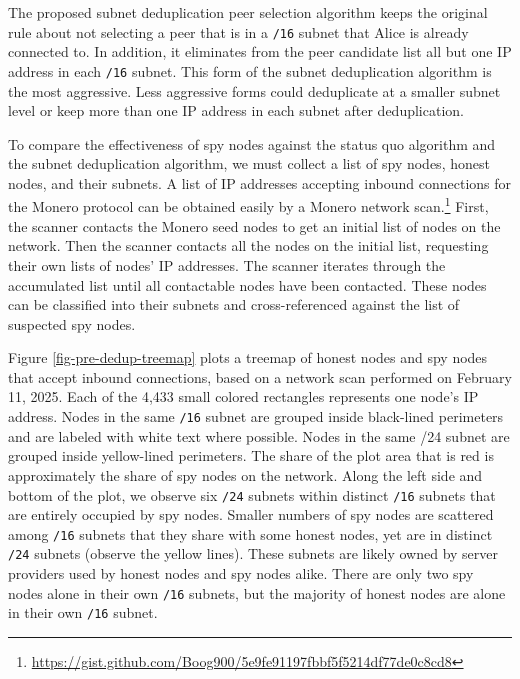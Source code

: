 \documentclass[usletter,11pt,english,openany]{article}
\begin{document}
The proposed subnet deduplication peer selection algorithm keeps the
original rule about not selecting a peer that is in a \texttt{/16}
subnet that Alice is already connected to. In addition, it eliminates
from the peer candidate list all but one IP address in each \texttt{/16}
subnet. This form of the subnet deduplication algorithm is the most
aggressive. Less aggressive forms could deduplicate at a smaller subnet
level or keep more than one IP address in each subnet after deduplication.

To compare the effectiveness of spy nodes against the status quo algorithm
and the subnet deduplication algorithm, we must collect a list of
spy nodes, honest nodes, and their subnets. A list of IP addresses
accepting inbound connections for the Monero protocol can be obtained
easily by a Monero network scan.\footnote{\href{https://gist.github.com/Boog900/5e9fe91197fbbf5f5214df77de0c8cd8}{https://gist.github.com/Boog900/5e9fe91197fbbf5f5214df77de0c8cd8}}
First, the scanner contacts the Monero seed nodes to get an initial
list of nodes on the network. Then the scanner contacts all the nodes
on the initial list, requesting their own lists of nodes' IP addresses.
The scanner iterates through the accumulated list until all contactable
nodes have been contacted. These nodes can be classified into their
subnets and cross-referenced against the list of suspected spy nodes.

Figure \ref{fig-pre-dedup-treemap} plots a treemap of honest nodes
and spy nodes that accept inbound connections, based on a network
scan performed on February 11, 2025. Each of the 4,433 small colored
rectangles represents one node's IP address. Nodes in the same \texttt{/16}
subnet are grouped inside black-lined perimeters and are labeled with
white text where possible. Nodes in the same /24 subnet are grouped
inside yellow-lined perimeters. The share of the plot area that is
red is approximately the share of spy nodes on the network. Along
the left side and bottom of the plot, we observe six \texttt{/24}
subnets within distinct \texttt{/16} subnets that are entirely occupied
by spy nodes. Smaller numbers of spy nodes are scattered among \texttt{/16}
subnets that they share with some honest nodes, yet are in distinct
\texttt{/24} subnets (observe the yellow lines). These subnets are
likely owned by server providers used by honest nodes and spy nodes
alike. There are only two spy nodes alone in their own \texttt{/16}
subnets, but the majority of honest nodes are alone in their own \texttt{/16}
subnet.
\end{document}
